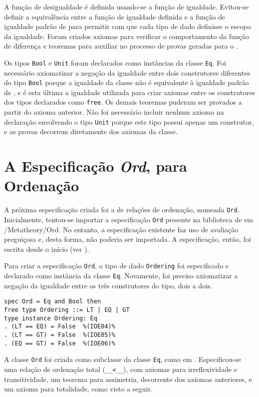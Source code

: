A função de desigualdade é definida usando-se a função de igualdade.
Evitou-se definir a equivalência entre a função de igualdade definida e a função de igualdade padrão de \HasCASL para permitir com que cada tipo de dado definisse o escopo da igualdade.
Foram criados axiomas para verificar o comportamento da função de diferença e teoremas para auxiliar no processo de provas geradas para o \Isabelle.

Os tipos \Verb.Bool. e \Verb.Unit. foram declarados como instâncias da classe \Verb.Eq..
Foi necessário axiomatizar a negação da igualdade entre dois construtores diferentes do tipo \Verb.Bool. porque a igualdade da classe não é equivalente à igualdade padrão de \HasCASL, e é esta última a igualdade utilizada para criar axiomas entre os construtores dos tipos declarados como \Verb.free..
Os demais teoremas puderam ser provados a partir do axioma anterior.
Não foi necessário incluir nenhum axioma na declaração envolvendo o tipo \Verb.Unit. porque este tipo possui apenas um construtor, e as provas decorrem diretamente dos axiomas da classe.

\section{A Especificação \textit{Ord}, para Ordenação}
A próxima especificação criada foi a de relações de ordenação, nomeada \Verb.Ord..
Inicialmente, tentou-se importar a especificação \Verb.Ord. presente na biblioteca de \CASL em \HasCASL/Metatheory/Ord.
No entanto, a especificação existente faz uso de avaliação preguiçosa e, desta forma, não poderia ser importada.
A especificação, então, foi escrita desde o início (ver ).

Para criar a especificação \Verb.Ord., o tipo de dado \Verb.Ordering. foi especificado e declarado como instância da classe \Verb.Eq..
Novamente, foi preciso axiomatizar a negação da igualdade entre os três construtores do tipo, dois a dois.

\begin{Verbatim}
spec Ord = Eq and Bool then
free type Ordering ::= LT | EQ | GT
type instance Ordering: Eq
. (LT == EQ) = False  %(IOE04)%
. (LT == GT) = False  %(IOE05)%
. (EQ == GT) = False  %(IOE06)%
\end{Verbatim}

A classe \Verb.Ord. foi criada como subclasse da classe \Verb.Eq., como em \Haskell.
Especificou-se uma relação de ordenação total (\Verb.__<__.), com axiomas para irreflexividade e transitividade, um teorema para assimetria, decorrente dos axiomas anteriores, e um axioma para totalidade, como visto a seguir.

